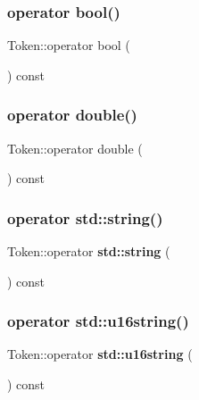 \mbox{\label{class_token_a34140d60656a12bbfcdfbcf85e985133}} 
\subsubsection{\texorpdfstring{operator bool()}{operator bool()}}
{\footnotesize\ttfamily Token\+::operator bool (\begin{DoxyParamCaption}{ }\end{DoxyParamCaption}) const}

\mbox{\label{class_token_a9d9ecf295a7bb23922db6ea5b9e97833}} 
\subsubsection{\texorpdfstring{operator double()}{operator double()}}
{\footnotesize\ttfamily Token\+::operator double (\begin{DoxyParamCaption}{ }\end{DoxyParamCaption}) const}

\mbox{\label{class_token_a37a03ca940a3abaec1491c9306bafa2a}} 
\subsubsection{\texorpdfstring{operator std\+::string()}{operator std::string()}}
{\footnotesize\ttfamily Token\+::operator \textbf{ std\+::string} (\begin{DoxyParamCaption}{ }\end{DoxyParamCaption}) const}

\mbox{\label{class_token_a4a746b837b7c624604a093eef1e88b12}} 
\subsubsection{\texorpdfstring{operator std\+::u16string()}{operator std::u16string()}}
{\footnotesize\ttfamily Token\+::operator \textbf{ std\+::u16string} (\begin{DoxyParamCaption}{ }\end{DoxyParamCaption}) const}

